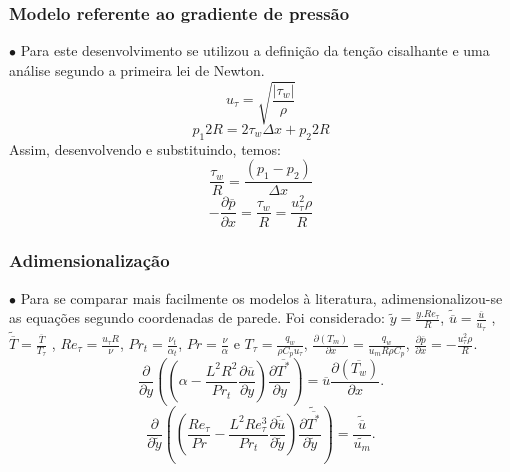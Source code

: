 \documentclass[xcolor=dvipsnames,10pt,aspectratio=169]{beamer}
\begin{document}
		
		
		
		\begin{frame}
		\frametitle{Modelo referente ao gradiente de pressão}
		$\bullet$ Para este desenvolvimento se utilizou a definição da tenção cisalhante e uma análise segundo a primeira lei de Newton.
		\begin{equation}
		u_\tau = \sqrt{\frac{\left| \tau_w \right|}{\rho}}
		\end{equation}
		\begin{equation}
		p_1 2R = 2 \tau_w \Delta x + p_2 2 R
		\end{equation}
		Assim, desenvolvendo e substituindo, temos:
		\begin{equation}
		\frac{\tau_w}{R} = \frac{(p_1 - p_2)}{\Delta x}
		\end{equation}
		\begin{equation}
		- \frac{\partial \overline{p}}{\partial x} = \frac{\tau_w}{R} = \frac{u_\tau^2 \rho}{R} 
		\end{equation}
		\end{frame}
	
	
	
	
	
	
		\begin{frame}
			\frametitle{Adimensionalização}
			$\bullet$ Para se comparar mais facilmente os modelos à literatura, adimensionalizou-se as equações segundo coordenadas de parede. Foi considerado: $ \tilde{y} = \frac{y . Re_\tau}{R} $, $ \tilde{\overline{u}} = \frac{\overline{u}}{u_\tau} $ , $ \tilde{\overline{T}} = \frac{\overline{T}}{T_\tau} $ , $Re_\tau = \frac{u_\tau R}{\nu}$, $Pr_t = \frac{\nu_t}{\alpha_t}$, $Pr = \frac{\nu}{\alpha}$ e $T_\tau = \frac{q_w}{\rho C_p u_\tau}$, $\frac{\partial{\left(T_m\right)}}{\partial{x}} = \frac{q_w}{u_m  R \rho  C_p } $, $\frac{\partial \overline{p}}{\partial x} = - \frac{u_\tau^2 \rho}{R} $.
			\\
				\begin{equation}
				{\frac{\partial{}}{\partial{y}}} \left( \left( \alpha   
				- \frac{{L}^2 R ^2}{Pr_t}\frac{\partial \overline{u}}{\partial y} \right) \frac{\partial \overline{T^\ast}}{\partial y} \right)
				= 
				\overline{u}\frac{\partial{}\left(\overline{T_w}\right)  }{\partial{x}}.
				\end{equation}
				\begin{equation}
				{\frac{\partial{}}{\partial{\tilde{y}}}} \left( \left( \frac{Re_\tau}{Pr}   
				- \frac{{L}^2 Re_\tau ^3}{Pr_t}\frac{\partial \tilde{\overline{u}}}{\partial \tilde{y}} \right) \frac{\partial \tilde{\overline{T^\ast}}}{\partial \tilde{y}} \right)
				= 
				\frac{\tilde{\overline{u}}}{\tilde{u_m}}.
				\end{equation}
		\end{frame}
	
\end{document}
